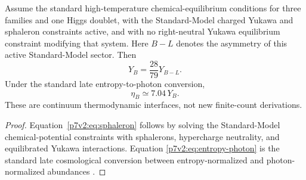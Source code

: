 \documentclass[12pt,a4paper]{article}
\begin{document}
\begin{proposition}
\label{p7v2:prop:standard-conversions}
Assume the standard high-temperature chemical-equilibrium conditions for three
families and one Higgs doublet, with the Standard-Model charged Yukawa and
sphaleron constraints active, and with no right-neutral Yukawa equilibrium
constraint modifying that system.  Here \(B-L\) denotes the asymmetry of
this active Standard-Model sector.  Then
\begin{equation}
\label{p7v2:eq:sphaleron}
 Y_B=\frac{28}{79}Y_{B-L}.
\end{equation}
Under the standard late entropy-to-photon conversion,
\begin{equation}
\label{p7v2:eq:entropy-photon}
 \eta_B\simeq7.04\,Y_B.
\end{equation}
These are continuum thermodynamic interfaces, not new finite-count
derivations.
\end{proposition}

\begin{proof}
Equation~\eqref{p7v2:eq:sphaleron} follows by solving the Standard-Model
chemical-potential constraints with sphalerons, hypercharge neutrality, and
equilibrated Yukawa interactions.  Equation
\eqref{p7v2:eq:entropy-photon} is the standard late cosmological conversion
between entropy-normalized and photon-normalized abundances
\cite{KapustaGale2006,PDG2024}.
\end{proof}
\end{document}
